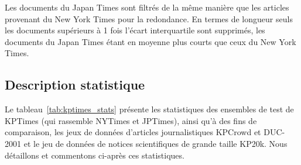 Les documents du Japan Times sont filtrés de la même manière que les articles provenant du New York Times pour la redondance. En termes de longueur seuls les documents supérieurs à 1 fois l'écart interquartile sont supprimés, les documents du Japan Times étant en moyenne plus courts que ceux du New York Times.






\subsection{Description statistique}

Le tableau~\ref{tab:kptimes_stats} présente les statistiques des ensembles de test de KPTimes (qui rassemble NYTimes et JPTimes), ainsi qu'à des fins de comparaison, les jeux de données d'articles journalistiques KPCrowd et DUC-2001 et le jeu de données de notices scientifiques de grande taille KP20k. Nous détaillons et commentons ci-après ces statistiques.


